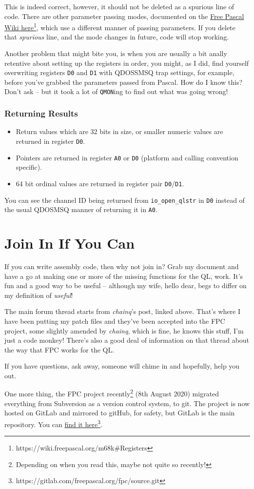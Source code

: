 This is indeed correct, however, it should not be deleted as a spurious
line of code. There are other parameter passing modes, documented
on the \href{https://wiki.freepascal.org/m68k\#Registers}{Free Pascal Wiki here}\footnote{https://wiki.freepascal.org/m68k\#Registers},
which use a different manner of passing parameters. If you delete
that \emph{spurious} line, and the mode changes in future, code will
stop working.

Another problem that might bite you, is when you are usually a bit
anally retentive about setting up the registers in order, you might,
as I did, find yourself overwriting registers \texttt{D0} and \texttt{D1}
with QDOSSMSQ trap settings, for example, before you've grabbed the
parameters passed from Pascal. How do I know this? Don't ask -- but
it took a lot of \texttt{QMON}ing to find out what was going wrong!

\subsubsection{Returning Results}
\begin{itemize}
\item Return values which are 32 bits in size, or smaller numeric values
are returned in register \texttt{D0}.
\item Pointers are returned in register \texttt{A0} or \texttt{D0} (platform
and calling convention specific).
\item 64 bit ordinal values are returned in register pair \texttt{D0}/\texttt{D1}.
\end{itemize}
You can see the channel ID being returned from \texttt{io\_open\_qlstr}
in \texttt{D0} instead of the usual QDOSMSQ manner of returning it
in \texttt{A0}.

\section{Join In If You Can}

If you can write assembly code, then why not join in? Grab my document
and have a go at making one or more of the missing functions for the
QL, work. It's fun and a good way to be useful -- although my wife,
hello dear, begs to differ on my definition of \emph{useful}!

The main forum thread starts from \emph{chainq}'s post, linked above.
That's where I have been putting my patch files and they've been accepted
into the FPC project, some slightly amended by \emph{chainq}, which
is fine, he knows this stuff, I'm just a code monkey! There's also
a good deal of information on that thread about the way that FPC works
for the QL.

If you have questions, ask away, someone will chime in and hopefully,
help you out.

One more thing, the FPC project recently\footnote{Depending on when you read this, maybe not quite so recently!}
(8th August 2020) migrated everything from Subversion as a version
control system, to git. The project is now hosted on GitLab and mirrored
to gitHub, for safety, but GitLab is the main repository. You can
\href{https://gitlab.com/freepascal.org/fpc/source.git}{find it here}\footnote{https://gitlab.com/freepascal.org/fpc/source.git}.
